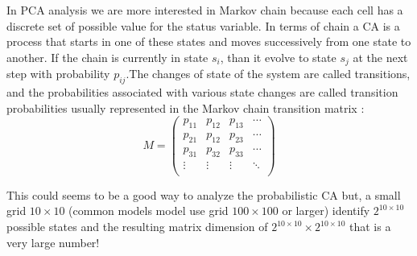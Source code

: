 In PCA analysis we are more interested in Markov chain because each cell has a
discrete set of possible value for the status variable.
In terms of chain a CA is a process that starts in one of these states and moves
successively from one state to another. If the chain is currently in state
\begin{math}s_i\end{math}, than it evolve to state \begin{math}s_j\end{math} at
the next step with probability \begin{math}p_{ij}\end{math}.The changes of state
of the system are called transitions, and the probabilities associated with
various state changes are called transition probabilities usually represented
in the Markov chain transition matrix :
\[
M =
\left( {\begin{array}{cccc}
p_{11} & p_{12} & p_{13} &\cdots \\
p_{21} & p_{12} & p_{23} &\cdots \\
p_{31} & p_{32} & p_{33} &\cdots \\
\vdots & \vdots  &\vdots& \ddots\\
\end{array} } \right)
\]

This could seems to be a good way to analyze the probabilistic CA but, a
small grid  \begin{math}10\times10\end{math} (common models model use grid
\begin{math}100\times100\end{math} or larger) identify
\begin{math}2^{10\times10}\end{math}possible states and the resulting matrix
dimension of \begin{math}2^{10\times10}\times2^{10\times10}\end{math} that is a
very large number!


